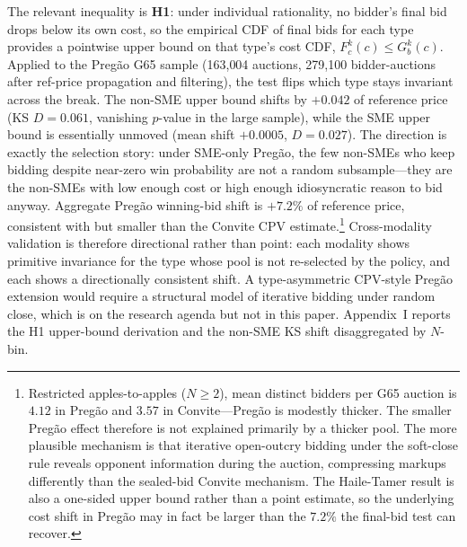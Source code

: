 \documentclass[12pt]{article}
\begin{document}
The relevant inequality is \textbf{H1}: under individual
rationality, no bidder's final bid drops below its own cost, so
the empirical CDF of final bids for each type provides a
pointwise upper bound on that type's cost CDF, $F_c^k(c) \leq
G_b^k(c)$. Applied to the Preg\~ao G65 sample (163{,}004
auctions, 279{,}100 bidder-auctions after ref-price propagation
and filtering), the test flips which type stays invariant
across the break. The non-SME upper bound shifts by $+0.042$ of
reference price (KS $D = 0.061$, vanishing $p$-value in the large
sample), while the SME upper bound is essentially unmoved (mean
shift $+0.0005$, $D = 0.027$). The direction is exactly the
selection story: under SME-only Preg\~ao, the few non-SMEs who
keep bidding despite near-zero win probability are not a random
subsample---they are the non-SMEs with low enough cost or high
enough idiosyncratic reason to bid anyway. Aggregate Preg\~ao
winning-bid shift is $+7.2\%$ of reference price, consistent
with but smaller than the Convite CPV
estimate.\footnote{Restricted apples-to-apples ($N \geq 2$),
mean distinct bidders per G65 auction is $4.12$ in Preg\~ao and
$3.57$ in Convite---Preg\~ao is modestly thicker. The smaller
Preg\~ao effect therefore is not explained primarily by a
thicker pool. The more plausible mechanism is that iterative
open-outcry bidding under the soft-close rule reveals opponent
information during the auction, compressing markups differently
than the sealed-bid Convite mechanism. The Haile-Tamer result
is also a one-sided upper bound rather than a point estimate, so
the underlying cost shift in Preg\~ao may in fact be larger than
the $7.2\%$ the final-bid test can recover.}
Cross-modality validation is therefore directional rather than
point: each modality shows primitive invariance for the type
whose pool is not re-selected by the policy, and each shows a
directionally consistent shift. A type-asymmetric CPV-style
Preg\~ao extension would require a structural model of iterative
bidding under random close, which is on the research agenda but
not in this paper. Appendix~I reports the H1 upper-bound
derivation and the non-SME KS shift disaggregated by $N$-bin.
\end{document}
